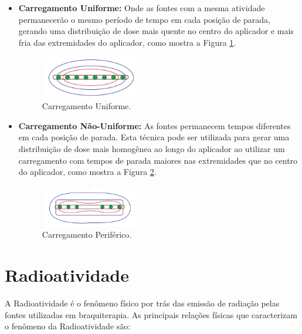 \documentclass[11pt,a4paper]{article}
\begin{document}
			\begin{itemize}
				\item \textbf{Carregamento Uniforme: } Onde as fontes com a mesma atividade permanecerão o mesmo período de tempo em cada posição de parada, gerando uma distribuição de dose mais quente no centro do aplicador e mais fria das extremidades do aplicador, como mostra a Figura \ref{img:carregamentoUniforme}.
				
					\begin{figure}[h]
						\centering
						\includegraphics[width=0.4\textwidth]{Imagens/carregamentoUniforme.jpg}
						\caption{Carregamento Uniforme.}
						\label{img:carregamentoUniforme}
					\end{figure}

				\item \textbf{Carregamento Não-Uniforme:} As fontes permanecem tempos diferentes em cada posição de parada. Esta técnica pode ser utilizada para gerar uma distribuição de dose mais homogênea ao longo do aplicador ao utilizar um carregamento com tempos de parada maiores nas extremidades que no centro do aplicador, como mostra a Figura \ref{img:carregamentoPeriferico}.
				
				\begin{figure}[h]
					\centering
					\includegraphics[width=0.4\textwidth]{Imagens/carregamentoPeriferico.jpg}
					\caption{Carregamento Periférico.}
					\label{img:carregamentoPeriferico}
				\end{figure}

			\end{itemize}
		
	\section{Radioatividade}

		A Radioatividade é o fenômeno físico por trás das emissão de radiação pelas fontes utilizadas em braquiterapia. As principais relações físicas que caracterizam o fenômeno da Radioatividade são:
\end{document}
